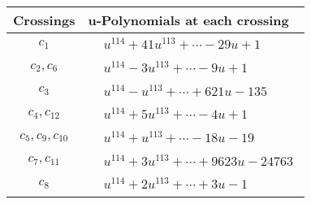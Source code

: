 \documentclass[1p]{elsarticle_modified}
\theoremstyle{definition}
\begin{document}
\begin{tabular}{m{50pt}|m{274pt}}
Crossings & \hspace{64pt}u-Polynomials at each crossing \\
\hline $$\begin{aligned}c_{1}\end{aligned}$$&$\begin{aligned}
&u^{114}+41 u^{113}+\cdots-29 u+1
\end{aligned}$\\
\hline $$\begin{aligned}c_{2},c_{6}\end{aligned}$$&$\begin{aligned}
&u^{114}-3 u^{113}+\cdots-9 u+1
\end{aligned}$\\
\hline $$\begin{aligned}c_{3}\end{aligned}$$&$\begin{aligned}
&u^{114}- u^{113}+\cdots+621 u-135
\end{aligned}$\\
\hline $$\begin{aligned}c_{4},c_{12}\end{aligned}$$&$\begin{aligned}
&u^{114}+5 u^{113}+\cdots-4 u+1
\end{aligned}$\\
\hline $$\begin{aligned}c_{5},c_{9},c_{10}\end{aligned}$$&$\begin{aligned}
&u^{114}+u^{113}+\cdots-18 u-19
\end{aligned}$\\
\hline $$\begin{aligned}c_{7},c_{11}\end{aligned}$$&$\begin{aligned}
&u^{114}+3 u^{113}+\cdots+9623 u-24763
\end{aligned}$\\
\hline $$\begin{aligned}c_{8}\end{aligned}$$&$\begin{aligned}
&u^{114}+2 u^{113}+\cdots+3 u-1
\end{aligned}$\\
\hline
\end{tabular}\\~\\
\newpage\renewcommand{\arraystretch}{1}
\end{document}
